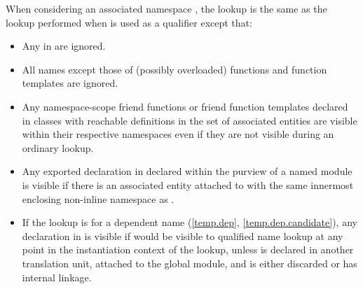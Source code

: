 \pnum
When considering an associated namespace ,
the lookup is the same as the
lookup performed when 
is used as a qualifier
except that:
\begin{itemize}
\item Any  in  are ignored.

\item All names except those of (possibly overloaded) functions and
function templates are ignored.

\item Any namespace-scope friend functions or friend function templates
declared in classes with reachable definitions in the set of associated entities
are visible within their respective
namespaces even if they are not visible during an ordinary
lookup.

\item
Any exported declaration  in 
declared within the purview of
a named module 
is visible
if there is an associated entity attached to 
with the same innermost enclosing non-inline namespace as .

\item
If the lookup is for a dependent name (\ref{temp.dep}, \ref{temp.dep.candidate}),
any declaration  in 
is visible
if  would be visible to qualified name lookup
at any point in the instantiation context of the lookup,
unless  is declared in another translation unit, attached to the global module,
and is either discarded or has internal linkage.
\end{itemize}

